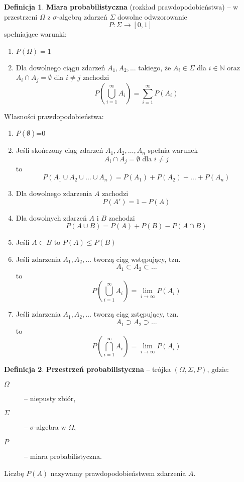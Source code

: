 \documentclass[11pt, leqno]{scrartcl}
\theoremstyle{definition}
\newtheorem{definition}{Definicja}[section]
\begin{document}
    \begin{definition}
        \textbf{Miara probabilistyczna} (rozkład prawdopodobieństwa)
        -- w przestrzeni $\Omega$ z $\sigma$-algebrą zdarzeń $\Sigma$
        dowolne odwzorowanie
        \[
            P:\Sigma \to [0,1]
        \]
        spełniające warunki:
        \begin{enumerate}
            \item $P(\Omega)=1$
            \item Dla dowolnego ciągu zdarzeń $A_1,A_2,\dots$ takiego,
                że $A_i \in \Sigma$ dla $i \in \mathbb{N}$ oraz
                $A_i \cap A_j=\emptyset$ dla $i \neq j$ zachodzi
                \[
                    P\left(\bigcup_{i=1}^{\infty}A_i\right)=
                    \sum_{i=1}^{\infty}P(A_i)
                \]
        \end{enumerate}
    \end{definition}
    Własności prawdopodobieństwa:
    \begin{enumerate}
        \item $P(\emptyset)$=0
        \item Jeśli skończony ciąg zdarzeń $A_1,A_2,\dots,A_n$ spełnia
            warunek
            \[
                A_i \cap A_j = \emptyset \text{ dla }i \neq j
            \]
            to
            \[
                P(A_1 \cup A_2 \cup \dots \cup A_n)=
                P(A_1)+P(A_2)+\dots +P(A_n)
            \]
        \item Dla dowolnego zdarzenia $A$ zachodzi
            \[
                P(A')=1-P(A)
            \]
        \item Dla dowolnych zdarzeń $A$ i $B$ zachodzi
            \[
                P(A \cup B)=P(A)+P(B)-P(A \cap B)
            \]
        \item Jeśli $A \subset B$ to $P(A)\leq P(B)$
        \item Jeśli zdarzenia $A_1,A_2,\dots$ tworzą ciąg
            wstępujący, tzn.
            \[
                A_1 \subset A_2 \subset \dots
            \]
            to
            \[
                P\left( \bigcup_{i=1}^{\infty}A_i \right)=
                \lim_{i \to \infty}P(A_i)
            \]
        \item Jeśli zdarzenia $A_1,A_2,\dots$ tworzą ciąg
            zstępujący, tzn.
            \[
                A_1 \supset A_2 \supset \dots
            \]
            to
            \[
                P\left( \bigcap_{i=1}^{\infty}A_i \right)=
                \lim_{i \to \infty}P(A_i)
            \]
    \end{enumerate}
    \begin{definition}
        \textbf{Przestrzeń probabilistyczna} -- trójka
        $(\Omega,\Sigma,P)$, gdzie:
        \begin{description}
            \item[$\Omega$] -- niepusty zbiór,
            \item[$\Sigma$] -- $\sigma$-algebra w $\Omega$,
            \item[$P$] -- miara probabilistyczna.
        \end{description}
    \end{definition}
    Liczbę $P(A)$ nazywamy prawdopodobieństwem zdarzenia $A$.
\end{document}
